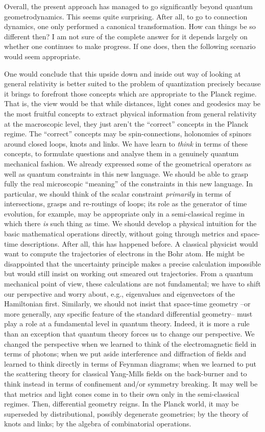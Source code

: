 Overall, the present approach has managed to go significantly beyond quantum
geometrodynamics. This seems quite surprising. After all, to go to connection
dynamics, one only performed a canonical transformation. How can things be so
different then? I am not sure of the complete answer for it depends largely
on whether one continues to make progress. If one does, then the following
scenario would seem appropriate.

One would conclude
that this upside down and inside out way of looking at general relativity is
better suited to the problem of quantization precisely because it brings to
forefront those concepts which are appropriate to the Planck regime. That is,
the view would be that while distances, light cones and geodesics may be the
most fruitful concepts to extract physical information from general relativity
at the macroscopic level, they just aren't the ``correct'' concepts in the
Planck regime. The ``correct'' concepts may be spin-connections, holonomies of
spinors around closed loops, knots and links. We have learn to {\it think} in
terms of these concepts, to formulate questions and analyse them in a genuinely
quantum mechanical fashion. We already expressed some of the geometrical
operators as well as quantum constraints in this new language. We should be
able to grasp fully the real microscopic ``meaning'' of the constraints in
this new language. In particular, we should think of the scalar constraint
{\it primarily} in terms of intersections, grasps and re-routings of loops;
its role as the generator of time evolution, for example, may be appropriate
only in a semi-classical regime in which there {\it is} such thing as time.
We should develop a physical intuition for the basic mathematical operations
directly, without going through metrics and space-time descriptions. After all,
this has happened before. A classical physicist would want to compute the
trajectories of electrons in the Bohr atom. He might be disappointed that
the uncertainty principle makes a precise calculation impossible but would
still insist on working out smeared out trajectories. From a quantum mechanical
point of view, these calculations are not fundamental; we have to shift our
perspective and worry about, e.g., eigenvalues and eigenvectors of the
Hamiltonian first. Similarly, we should not insist that space-time geometry
--or more generally, any specific feature of the standard differential
geometry-- must play a
role at a fundamental level in quantum theory. Indeed, it is more a rule
than an exception that quantum theory forces us to change our perspective.
We changed the perspective when we learned to think of the electromagnetic
field in terms of photons; when we put aside interference and diffraction
of fields and learned to think directly in terms of Feynman diagrams;
when we learned to put the scattering theory for classical Yang-Mills fields
on the back-burner and to think instead in terms of confinement and/or
symmetry breaking. It may well be that metrics and light cones come in to
their own only in the semi-classical regimes. Then, differential geometry
reigns. In the Planck world, it may be superseded by distributional, possibly
degenerate geometries; by the theory of knots and links; by the algebra of
combinatorial operations.

